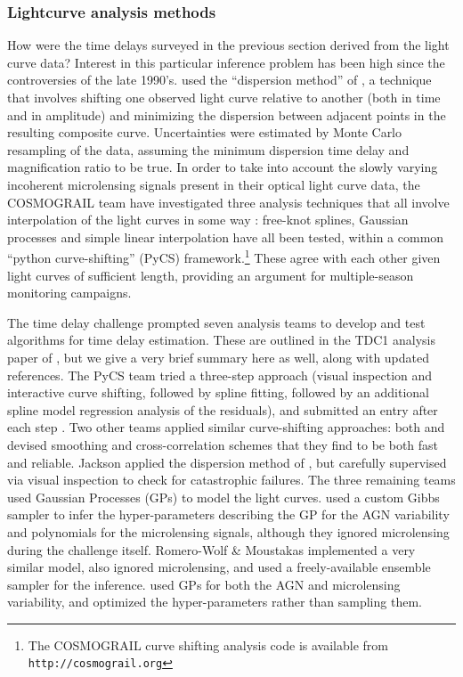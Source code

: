 
\subsubsection{Lightcurve analysis methods}

How were the time delays surveyed in the previous section derived from
the light curve data? Interest in this particular inference problem
has been high since the controversies of the late
1990's. \citet{Fas++99} used the ``dispersion method'' of
\citet{Pelt++96}, a technique that involves shifting one observed
light curve relative to another (both in time and in amplitude) and
minimizing the dispersion between adjacent points in the resulting
composite curve. Uncertainties were estimated by Monte Carlo
resampling of the data, assuming the minimum dispersion time delay and
magnification ratio to be true. In order to take into account the
slowly varying incoherent microlensing signals present in their
optical light curve data, the COSMOGRAIL team have investigated three
analysis techniques that all involve interpolation of the light curves
in some way \citep{TCM13}: free-knot splines, Gaussian processes and
simple linear interpolation have all been tested, within a common
``python curve-shifting'' (PyCS) framework.\footnote{The COSMOGRAIL
curve shifting analysis code is available from
\texttt{http://cosmograil.org}} These agree with each other given
light curves of sufficient length, providing an argument for
multiple-season monitoring campaigns.

The time delay challenge prompted seven analysis teams to develop and
test algorithms for time delay estimation. These are outlined in the
TDC1 analysis paper of \citet{LiaoEtal2015}, but we give a very brief
summary here as well, along with updated references. The PyCS team tried
a three-step approach (visual inspection and interactive curve shifting,
followed by spline fitting, followed  by an additional spline model
regression analysis of the residuals), and submitted an entry after each
step \citep{BonvinEtal2016}. Two other teams applied similar
curve-shifting approaches: both \citet{A+S2015} and \citet{RK++2015}
devised smoothing and cross-correlation schemes that they find to be
both fast and reliable. Jackson applied the dispersion method of
\citet{Pelt++96}, but carefully supervised via visual inspection to
check for  catastrophic failures.  The three remaining teams used
Gaussian Processes (GPs) to model the light curves. \citet{TakEtal2016}
used a custom Gibbs sampler to infer the hyper-parameters describing the
GP for the AGN variability and polynomials for the microlensing signals,
although they ignored microlensing during the challenge itself.
Romero-Wolf \& Moustakas implemented a very similar model, also ignored
microlensing, and used a freely-available ensemble sampler for the
inference. \citet{H+L2014} used GPs for both the AGN and microlensing
variability, and optimized the hyper-parameters rather than sampling
them.

